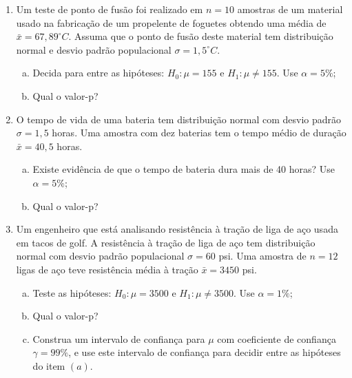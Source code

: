 \documentclass[12pt, a4paper]{article}
\begin{document}
\begin{enumerate}
	\item Um teste de ponto de fusão foi realizado em  $n=10$ amostras de um material usado na fabricação de um propelente de foguetes obtendo uma média de $\bar{x} = 67,89^\circ C$. Assuma que o ponto de fusão deste material tem distribuição normal e desvio padrão populacional $\sigma = 1,5^\circ C$.
	\begin{enumerate}[(a)]
		\item Decida para entre as hipóteses: $H_0: \mu = 155$ e $H_1: \mu \neq 155$. Use $\alpha = 5\%$;
		\item Qual o valor-p?
	\end{enumerate}

	\item O tempo de vida de uma bateria tem distribuição normal com desvio padrão $\sigma=1,5$ horas. Uma amostra com dez baterias tem o tempo médio de duração $\bar{x} = 40,5$ horas. 
	\begin{enumerate}[(a)]
		\item Existe evidência de que o tempo de bateria dura mais de 40 horas? Use $\alpha=5\%$;
		\item Qual o valor-p?
	\end{enumerate}

	\item Um engenheiro que está analisando resistência à tração de liga de aço usada em tacos de golf. A resistência à tração de liga de aço tem distribuição normal com desvio padrão populacional $\sigma = 60$ psi. Uma amostra de $n=12$ ligas de aço teve resistência média à tração $\bar{x} = 3450$ psi.
	\begin{enumerate}[(a)]
		\item Teste as hipóteses: $H_0: \mu = 3500$  e $H_1: \mu \neq 3500$. Use $\alpha = 1\%$;
		\item Qual o valor-p?
		\item Construa um intervalo de confiança para $\mu$ com coeficiente de confiança $\gamma=99\%$, e use este intervalo de confiança para decidir entre as hipóteses do item $(a)$.
	\end{enumerate}


\end{enumerate}
\end{document}
